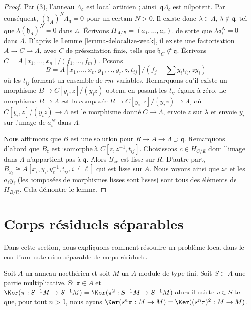 \begin{proof}
Par (3), l'anneau $\Lambda_\mathfrak q$ est local artinien ; ainsi,
$\mathfrak q\Lambda_\mathfrak q$ est nilpotent. Par conséquent,
$(\mathfrak h_A)^N \Lambda_\mathfrak q = 0$ pour un certain $N > 0$.
Il existe donc $\lambda \in \Lambda$, $\lambda \not \in \mathfrak q$,
tel que $\lambda (\mathfrak h_A)^N = 0$ dans $\Lambda$.
Écrivons $H_{A/R} = (a_1, \ldots, a_r)$, de sorte que $\lambda a_i^N = 0$
dans $\Lambda$. D'après le Lemme \ref{lemma-delocalize-weak}, il existe une factorisation
$A \to C \to \Lambda$, avec $C$ de présentation finie, telle que
$\mathfrak h_C \not \subset \mathfrak q$.
Écrivons $C = A[x_1, \ldots, x_n]/(f_1, \ldots, f_m)$.
Posons
$$
B = A[x_1, \ldots, x_n, y_1, \ldots, y_r, z, t_{ij}]/
(f_j - \sum y_i t_{ij}, zy_i)
$$
où les $t_{ij}$ forment un ensemble de $rm$ variables.
Remarquons qu'il existe un morphisme $B \to C[y_i, z]/(y_iz)$ obtenu en posant les $t_{ij}$
égaux à zéro. Le morphisme $B \to \Lambda$ est la composée
$B \to C[y_i, z]/(y_iz) \to \Lambda$, où $C[y_i, z]/(y_iz) \to \Lambda$
est le morphisme donné $C \to \Lambda$, envoie $z$ sur $\lambda$ et envoie
$y_i$ sur l'image de $a_i^N$ dans $\Lambda$.

\medskip\noindent
Nous affirmons que $B$ est une solution pour $R \to A \to \Lambda \supset \mathfrak q$.
Remarquons d'abord que $B_z$ est isomorphe à $C[z, z^{-1}, t_{ij}]$.
Choisissons $c \in H_{C/R}$ dont l'image dans $\Lambda$ n'appartient pas à
$\mathfrak q$. Alors $B_{zc}$ est lisse sur $R$. D'autre part,
$B_{y_\ell} \cong A[x_i, y_i, y_\ell^{-1}, t_{ij}, i \not = \ell]$
qui est lisse sur $A$. Nous voyons ainsi que $zc$ et les $a_\ell y_\ell$
(les composées de morphismes lisses sont lisses) sont tous
des éléments de $H_{B/R}$. Cela démontre le lemme.
\end{proof}




\section{Corps résiduels séparables}
\label{section-separable}

\noindent
Dans cette section, nous expliquons comment résoudre un problème local dans le cas
d'une extension séparable de corps résiduels.

\begin{lemma}[Ogoma]
\label{lemma-ogoma}
Soit $A$ un anneau noethérien et soit $M$ un $A$-module de type fini.
Soit $S \subset A$ une partie multiplicative. Si $\pi \in A$ et
$\Ker(\pi : S^{-1}M \to S^{-1}M) =
\Ker(\pi^2 : S^{-1}M \to S^{-1}M)$
alors il existe $s \in S$ tel que, pour tout $n > 0$, nous ayons
$\Ker(s^n\pi : M \to M) = \Ker((s^n\pi)^2 : M \to M)$.
\end{lemma}

